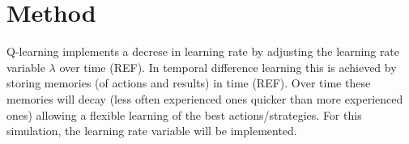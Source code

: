 \chapter{Method}

Q-learning implements a decrese in learning rate by adjusting the learning rate variable $\lambda$ over time (REF). In temporal difference learning this is achieved by storing memories (of actions and results) in time (REF). Over time these memories will decay (less often experienced ones quicker than more experienced ones) allowing a flexible learning of the best actions/strategies. For this simulation, the learning rate variable will be implemented. 